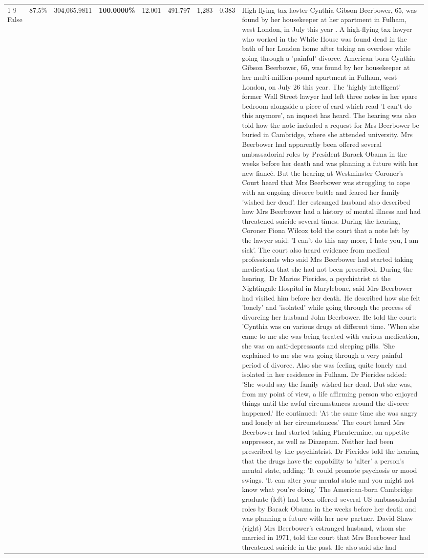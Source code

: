 \begin{table}[H]
\begin{tabular}{lllrlllll}
\cline{1-9}
False & 87.5\% & \color{red} 304,065.9811 & \bfseries \color{red} 100.0000\% & 12.001 & 491.797 & 1,283 & 0.383 & High-flying tax lawter Cynthia Gibson Beerbower, 65, was found by her housekeeper at her apartment in Fulham, west London, in July this year . A high-flying tax lawyer who worked in the White House was found dead in the bath of her London home after taking an overdose while going through a 'painful' divorce. American-born Cynthia Gibson Beerbower, 65, was found by her housekeeper at her multi-million-pound apartment in Fulham, west London, on July 26 this year. The 'highly intelligent' former Wall Street lawyer had left three notes in her spare bedroom alongside a piece of card which read 'I can't do this anymore', an inquest has heard. The hearing was also told how the note included a request for Mrs Beerbower be buried in Cambridge, where she attended university. Mrs Beerbower had apparently been offered several ambassadorial roles by President Barack Obama in the weeks before her death and was planning a future with her new fiancé. But the hearing at Westminster Coroner's Court heard that Mrs Beerbower was struggling to cope with an ongoing divorce battle and feared her family 'wished her dead'. Her estranged husband also described how Mrs Beerbower had a history of mental illness and had threatened suicide several times. During the hearing, Coroner Fiona Wilcox told the court that a note left by the lawyer said: 'I can't do this any more, I hate you, I am sick'. The court also heard evidence from medical professionals who said Mrs Beerbower had started taking medication that she had not been prescribed. During the hearing, Dr Marios Pierides, a psychiatrist at the Nightingale Hospital in Marylebone, said Mrs Beerbower had visited him before her death. He described how she felt 'lonely' and 'isolated' while going through the process of divorcing her husband John Beerbower. He told the court: 'Cynthia was on various drugs at different time. 'When she came to me she was being treated with various medication, she was on anti-depressants and sleeping pills. 'She explained to me she was going through a very painful period of divorce. Also she was feeling quite lonely and isolated in her residence in Fulham. Dr Pierides added: 'She would say the family wished her dead. But she was, from my point of view, a life affirming person who enjoyed things until the awful circumstances around the divorce happened.' He continued: 'At the same time she was angry and lonely at her circumstances.' The court heard Mrs Beerbower had started taking Phentermine, an appetite suppressor, as well as Diazepam. Neither had been prescribed by the psychiatrist. Dr Pierides told the hearing that the drugs have the capability to 'alter' a person's mental state, adding: 'It could promote psychosis or mood swings. 'It can alter your mental state and you might not know what you're doing.' The American-born Cambridge graduate (left) had been offered several US ambassadorial roles by Barack Obama in the weeks before her death and was planning a future with her new partner, David Shaw (right) Mrs Beerbower's estranged husband, whom she married in 1971, told the court that Mrs Beerbower had threatened suicide in the past. He also said she had 
\end{tabular}
\end{table}

